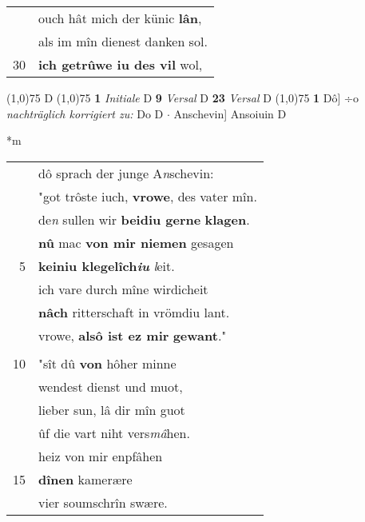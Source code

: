 \documentclass[8pt,a4paper,notitlepage]{article}
\begin{document}
\begin{table}[ht]
\begin{minipage}[t]{0.5\linewidth}
\begin{tabular}{rl}
 & ouch hât mich der künic \textbf{lân},\\ 
 & als im mîn dienest danken sol.\\ 
30 & \textbf{ich getrûwe iu des vil} wol,\\ 
\end{tabular}
\scriptsize
\line(1,0){75} \newline
D \newline
\line(1,0){75} \newline
\textbf{1} \textit{Initiale} D  \textbf{9} \textit{Versal} D  \textbf{23} \textit{Versal} D  \newline
\line(1,0){75} \newline
\textbf{1} Dô] ÷o \textit{nachträglich korrigiert zu:} Do D  $\cdot$ Anschevin] Ansoiuin D \newline
\end{minipage}
\hspace{0.5cm}
\begin{minipage}[t]{0.5\linewidth}
\small
\begin{center}*m
\end{center}
\begin{tabular}{rl}
 & dô sprach der junge A\textit{n}schevin:\\ 
 & "got trôste iuch, \textbf{vrowe}, des vater mîn.\\ 
 & de\textit{n} sullen wir \textbf{beidiu gerne} \textbf{klagen}.\\ 
 & \textbf{nû} mac \textbf{von mir niemen} gesagen\\ 
5 & \textbf{keiniu klegelîch\textit{iu}} \textit{l}eit.\\ 
 & ich vare durch mîne wirdicheit\\ 
 & \textbf{nâch} ritterschaft in vrömdiu lant.\\ 
 & vrowe, \textbf{alsô ist ez mir} \textbf{gewant}."\\ 
 & \textit{\begin{large}D\end{large}}ô sprach diu küniginne:\\ 
10 & "sît dû \textbf{von} hôher minne\\ 
 & wendest dienst und muot,\\ 
 & lieber sun, lâ dir mîn guot\\ 
 & ûf die vart niht vers\textit{mâ}hen.\\ 
 & heiz von mir enpfâhen\\ 
15 & \textbf{dînen} kamerære\\ 
 & vier soumschrîn swære.\\ 

\end{tabular}
\end{minipage}
\end{table}
\end{document}
